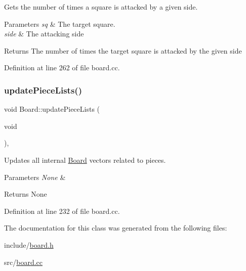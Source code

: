 Gets the number of times a square is attacked by a given side. 


\begin{DoxyParams}{Parameters}
{\em sq} & The target square. \\
\hline
{\em side} & The attacking side \\
\hline
\end{DoxyParams}
\begin{DoxyReturn}{Returns}
The number of times the target square is attacked by the given side 
\end{DoxyReturn}


Definition at line 262 of file board.\+cc.

\mbox{\label{classBoard_a2b86adf733a5509848f0cc689be49866}} 
\subsubsection{\texorpdfstring{update\+Piece\+Lists()}{updatePieceLists()}}
{\footnotesize\ttfamily void Board\+::update\+Piece\+Lists (\begin{DoxyParamCaption}\item[{void}]{ }\end{DoxyParamCaption})\hspace{0.3cm}{\ttfamily [private]}, {\ttfamily [noexcept]}}



Updates all internal \mbox{\hyperlink{classBoard}{Board}} vectors related to pieces. 


\begin{DoxyParams}{Parameters}
{\em None} & \\
\hline
\end{DoxyParams}
\begin{DoxyReturn}{Returns}
None 
\end{DoxyReturn}


Definition at line 232 of file board.\+cc.



The documentation for this class was generated from the following files\+:\begin{DoxyCompactItemize}
\item 
include/\mbox{\hyperlink{board_8h}{board.\+h}}\item 
src/\mbox{\hyperlink{board_8cc}{board.\+cc}}\end{DoxyCompactItemize}
